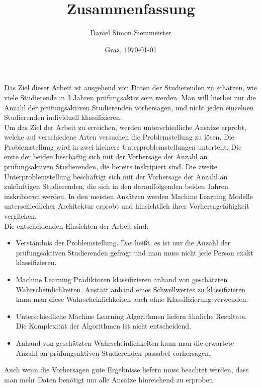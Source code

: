 \documentclass[a4paper, german, 11pt]{article}
\title{Zusammenfassung}
\author{Daniel Simon Siemmeister}
\date{Graz, \today{}}
\begin{document}
\maketitle
\thispagestyle{empty}

Das Ziel dieser Arbeit ist ausgehend von Daten der Studierenden zu sch\"atzen, wie viele
Studierende in 3 Jahren pr\"ufungsaktiv sein werden. Man will hierbei nur die Anzahl der pr\"ufungsaktiven Studierenden vorhersagen,
und nicht jeden einzelnen Studierenden individuell klassifizieren.\\

Um das Ziel der Arbeit zu erreichen, werden unterschiedliche Ans\"atze erprobt, welche auf verschiedene Arten versuchen die Problemstellung zu l\"osen.
Die Problemstellung wird in zwei kleinere Unterproblemstellungen unterteilt. Die erste der beiden besch\"aftig sich mit der Vorhersage der Anzahl an pr\"ufungsaktiven Studierenden,
die bereits inskripiert sind. Die zweite Unterproblemstellung besch\"aftigt sich mit der Vorhersage der Anzahl an zuk\"unftigen Studierenden, die sich in den darauffolgenden beiden Jahren inskribieren werden.
In den meisten Ans\"atzen werden Machine Learning Modelle unterschiedlicher Architektur erprobt und hinsichtlich ihrer Vorhersagef\"ahigkeit
verglichen.\\

Die entscheidenden Einsichten der Arbeit sind:
\begin{itemize}
    \item Verst\"andnis der Problemstellung. Das hei{\ss}t, es ist nur die Anzahl der pr\"ufungsaktiven Studierenden gefragt und man muss nicht jede Person exakt klassifizieren.
    \item Machine Learning Pr\"adiktoren klassifizieren anhand von gesch\"atzten Wahrscheinlichkeiten. Anstatt anhand eines Schwellwertes zu klassifizieren
          kann man diese Wahrscheinlichkeiten auch ohne Klassifizierung verwenden.
    \item Unterschiedliche Machine Learning Algorithmen liefern \"ahnliche Resultate. Die Komplexit\"at der Algorithmen ist nicht entscheidend.
    \item Anhand von gesch\"atzten Wahrscheinlichkeiten kann man die erwartete Anzahl an pr\"ufungsaktiven Studierenden passabel vorhersagen.
\end{itemize}

Auch wenn die Vorhersagen gute Ergebnisse liefern muss beachtet werden, dass man mehr Daten ben\"otigt um alle Ans\"atze hinreichend zu erproben.
\end{document}
